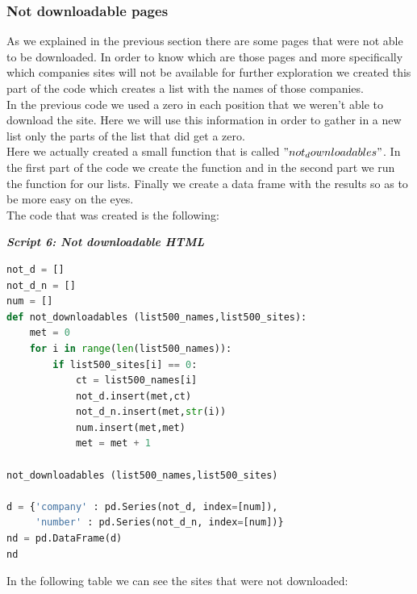 \documentclass{article}
\begin{document}
\subsubsection{Not downloadable pages}
As we explained in the previous section there are some pages that were not able to be downloaded. In order to know which are those pages and more specifically which companies sites will not be available for further exploration we created this part of the code which creates a list with the names of those companies.\\
In the previous code we used a zero in each position that we weren't able to download the site. Here we will use this information in order to gather in a new list only the parts of the list that did get a zero.\\
Here we actually created a small function that is called $"not_downloadables"$. In the first part of the code we create the function and in the second part we run the function for our lists. Finally we create a data frame with the results so as to be more easy on the eyes.\\
The code that was created is the following:
\begin{center}
\textit{\textbf{Script 6: Not downloadable HTML}}
\end{center}
\begin{lstlisting}[language=Python]
not_d = []
not_d_n = []
num = []
def not_downloadables (list500_names,list500_sites):
    met = 0       
    for i in range(len(list500_names)):       
        if list500_sites[i] == 0:
            ct = list500_names[i]
            not_d.insert(met,ct)
            not_d_n.insert(met,str(i))
            num.insert(met,met)
            met = met + 1

not_downloadables (list500_names,list500_sites)

d = {'company' : pd.Series(not_d, index=[num]),
     'number' : pd.Series(not_d_n, index=[num])}
nd = pd.DataFrame(d)    
nd
\end{lstlisting}
In the following table we can see the sites that were not downloaded: 
\end{document}
